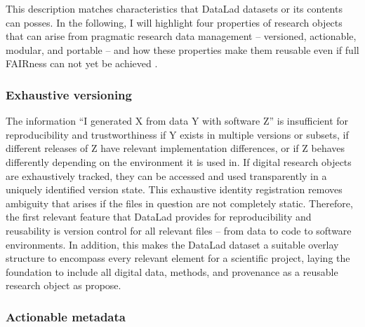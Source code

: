 This description matches characteristics that DataLad datasets or its contents can posses.
In the following, I will highlight four properties of research objects that can arise from pragmatic research data management -- versioned, actionable, modular, and portable -- and how these properties make them reusable  even if full FAIRness can not yet be achieved \citep{wagnerohbm2021}.

\subsubsection{Exhaustive versioning}

The information ``I generated X from data Y with software Z'' is insufficient for reproducibility and trustworthiness if Y exists in multiple versions or subsets, if different releases of Z have relevant implementation differences, or if Z behaves differently depending on the environment it is used in.
If digital research objects are exhaustively tracked, they can be accessed and used transparently in a uniquely identified version state.
This exhaustive identity registration removes ambiguity that arises if the files in question are not completely static.
Therefore, the first relevant feature that DataLad provides for reproducibility and reusability is version control for all relevant files -- from data to code to software environments.
In addition, this makes the DataLad dataset a suitable overlay structure to encompass every relevant element for a scientific project, laying the foundation to include all digital data, methods, and provenance as a reusable research object as \citet{bechhofer2010research} propose.

\subsubsection{Actionable metadata}

